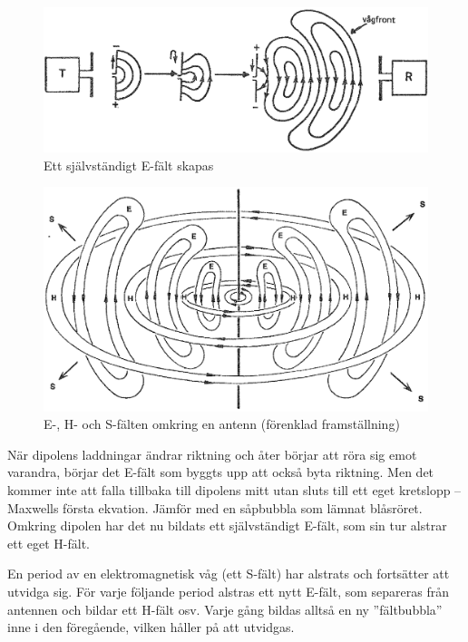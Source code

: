\begin{figure}
\includegraphics[width=\textwidth]{images/cropped_pdfs/bild_2_7-04.pdf}
\caption{Ett självständigt E-fält skapas}
\label{fig:BildII7-04}
\end{figure}

\begin{figure}
\includegraphics[width=\textwidth]{images/cropped_pdfs/bild_2_7-05.pdf}
\caption{E-, H- och S-fälten omkring en antenn (förenklad framställning)}
\label{fig:BildII7-05}
\end{figure}

När dipolens laddningar ändrar riktning och åter börjar att röra sig
emot varandra, börjar det E-fält som byggts upp att också byta riktning.
Men det kommer inte att falla tillbaka till dipolens mitt
utan sluts till ett eget kretslopp -- Maxwells första ekvation.
Jämför med en såpbubbla som lämnat blåsröret.
Omkring dipolen har det nu bildats ett självständigt E-fält, som sin tur
alstrar ett eget H-fält.

En period av en elektromagnetisk våg (ett S-fält) har alstrats och
fortsätter att utvidga sig.
För varje följande period alstras ett nytt E-fält, som separeras från antennen
och bildar ett H-fält osv.
Varje gång bildas alltså en ny ''fältbubbla'' inne i den föregående, vilken
håller på att utvidgas.

